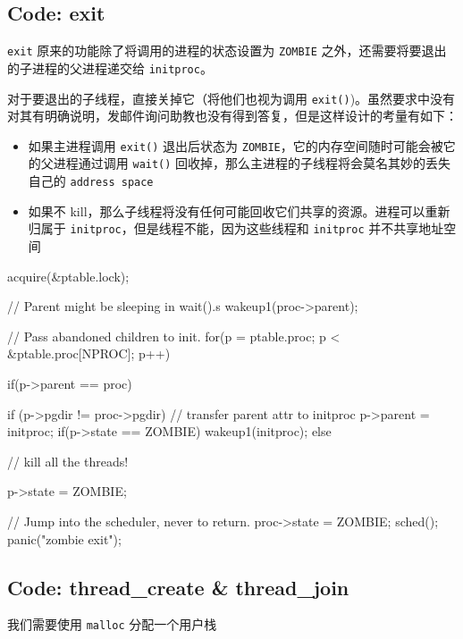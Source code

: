 \subsection{Code: exit}

\texttt{exit} 原来的功能除了将调用的进程的状态设置为 \texttt{ZOMBIE} 之外，还需要将要退出的子进程的父进程递交给 \texttt{initproc}。

对于要退出的子线程，直接关掉它（将他们也视为调用 \texttt{exit()})。虽然要求中没有对其有明确说明，发邮件询问助教也没有得到答复，但是这样设计的考量有如下：

\begin{itemize}
    \item 如果主进程调用 \texttt{exit()} 退出后状态为 \texttt{ZOMBIE}，它的内存空间随时可能会被它的父进程通过调用 \texttt{wait()} 回收掉，那么主进程的子线程将会莫名其妙的丢失自己的 \texttt{address space}
    \item 如果不 kill，那么子线程将没有任何可能回收它们共享的资源。进程可以重新归属于 \texttt{initproc}，但是线程不能，因为这些线程和 \texttt{initproc} 并不共享地址空间
\end{itemize}

\begin{ccode}
    acquire(&ptable.lock);
            
    // Parent might be sleeping in wait().s
    wakeup1(proc->parent);
            
    // Pass abandoned children to init.
    for(p = ptable.proc; p < &ptable.proc[NPROC]; p++){
        if(p->parent == proc){
            if (p->pgdir != proc->pgdir) {
                // transfer parent attr to initproc
                p->parent = initproc;
                if(p->state == ZOMBIE)
                wakeup1(initproc);
                } else {
                // kill all the threads!
                                                        
                p->state = ZOMBIE;
            }
        }
    }
            
    // Jump into the scheduler, never to return.
    proc->state = ZOMBIE;
    sched();
    panic("zombie exit");
\end{ccode}


\subsection{Code: thread\_create \& thread\_join}

我们需要使用 \texttt{malloc} 分配一个用户栈


